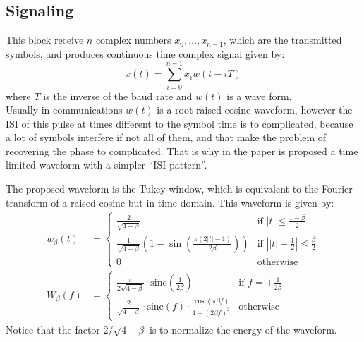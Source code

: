 \subsection{Signaling}

This block receive $n$ complex numbers $x_0,\dotsc,x_{n-1}$, which are the transmitted symbols, and produces continuous time complex signal given by:
\begin{equation}
x(t)=\sum_{i=0}^{n-1}x_iw(t-iT)
\label{eq:Tukey_signaling_block}
\end{equation}
where $T$ is the inverse of the baud rate and $w(t)$ is a wave form.\\

Usually in communications $w(t)$ is a root raised-cosine waveform, however the ISI of this pulse at times different to the symbol time is to complicated, because a lot of symbols interfere if not all of them, and that make the problem of recovering the phase to complicated. That is why in the paper is proposed a time limited waveform with a simpler ``ISI pattern''.

The proposed waveform is the Tukey window, which is equivalent to the Fourier transform of a raised-cosine but in time domain.
This waveform is given by:
\begin{align}
	w_\beta(t)&=\left\{
\begin{array}{ll}
 \frac{2}{\sqrt{4-\beta}} & \text{if } |t|\leq\frac{1-\beta}{2}\\
 \frac{1}{\sqrt{4-\beta}}\left(1-\sin\left(\frac{\pi(2|t|-1)}{2\beta}\right)\right)&\text{if } \left||t|-\frac{1}{2}\right|\leq\frac{\beta}{2}\\
  0&\text{otherwise}  
\end{array}
\right.
\label{eq:Tukey_window_TD}\\
W_\beta(f)&=\left\{
\begin{array}{ll}
  \frac{\pi}{2\sqrt{4-\beta}}\cdot\text{sinc}\left(\frac{1}{2\beta}\right)&\text{if } f=\pm\frac{1}{2\beta}\\
  \frac{2}{\sqrt{4-\beta}}\cdot\text{sinc}(f)\cdot\frac{\cos(\pi\beta f)}{1-(2\beta f)^2}&\text{otherwise}   
\end{array}
\right.
\label{eq:Tukey_window_FD}
\end{align}
Notice that the factor $2/\sqrt{4-\beta}$ is to normalize the energy of the waveform.\\

